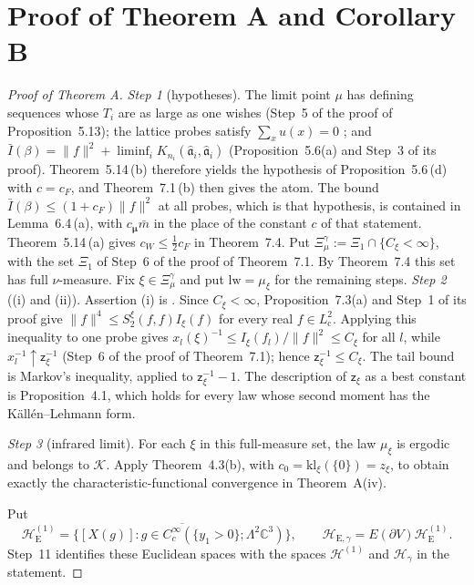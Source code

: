 \documentclass[11pt]{amsart}
\theoremstyle{definition}
\begin{document}
\section{Proof of Theorem A and Corollary B}
\begin{proof}[Proof of Theorem A]
\emph{Step 1} (hypotheses).
The limit point $\mu$ has defining sequences whose $T_i$ are as large as one wishes (Step~5 of the proof of Proposition~5.13);
the lattice probes satisfy $\sum_xu(x)=0$ \cite[Proposition~47.1\,(b1)]{QEDIII};
and $\bar I(\beta)=\allowbreak \|f\|^2+\liminf_iK_{n_i}(\hat{\mathfrak a}_i,\allowbreak \hat{\mathfrak a}_i)$ (Proposition~5.6(a) and Step~3 of its proof).
Theorem~5.14\,(b) therefore yields the hypothesis of Proposition~5.6\,(d) with $c=c_F$, and Theorem~7.1\,(b) then gives the atom.
The bound $\bar I(\beta)\le(1+c_F)\|f\|^2$ at all probes, which is that hypothesis, is contained in Lemma~6.4\,(a), with $c_{\boldsymbol\mu}\bar m$ in the place of the constant $c$ of that statement.
Theorem~5.14\,(a) gives $c_W\le\frac12c_F$ in Theorem~7.4.
Put $\Xi^\gamma_\mu:=\Xi_1\cap\{C_\xi<\infty\}$, with the set $\Xi_1$ of Step~6 of the proof of Theorem~7.1. By Theorem~7.4 this set has full $\nu$-measure.
Fix $\xi\in\Xi^\gamma_\mu$ and put $\mathrm{lw}=\mu_\xi$ for the remaining steps.
\emph{Step 2} ((i) and (ii)).
Assertion (i) is \cite[Theorem~1.4, Part~I\,(e), (f), Part~II]{QEDII}.
Since $C_\xi<\infty$, Proposition~7.3(a) and Step~1 of its proof give
$\|f\|^4\le S_2^\xi(f,f)I_\xi(f)$ for every real $f\in L^2_{\mathrm c}$.
Applying this inequality to one probe gives $x_l(\xi)^{-1}\le I_\xi(f_l)/\|f\|^2\le C_\xi$ for all $l$, while $x_l^{-1}\uparrow\mathsf z_\xi^{-1}$ (Step~6 of the proof of Theorem~7.1);
hence $\mathsf z_\xi^{-1}\le C_\xi$.
The tail bound is Markov's inequality, applied to $\mathsf z_\xi^{-1}-1$.
The description of $\mathsf z_\xi$ as a best constant is Proposition~4.1, which holds for every law whose second moment has the K\"all\'en--Lehmann form.

\emph{Step 3} (infrared limit).
For each $\xi$ in this full-measure set, the law $\mu_\xi$ is ergodic
and belongs to $\mathcal K$. Apply Theorem~4.3(b), with
$c_0=\mathrm{kl}_\xi(\{0\})=z_\xi$, to obtain exactly the
characteristic-functional convergence in Theorem~A(iv).

Put
\[
\mathcal H_{\mathrm E}^{(1)}=
\overline{\{[X(g)]:g\in C_c^\infty(\{y_1>0\};\Lambda^2\mathbb C^3)\}},
\qquad
\mathcal H_{\mathrm E,\gamma}=E(\partial V)\mathcal H_{\mathrm E}^{(1)}.
\]
Step~11 identifies these Euclidean spaces with the spaces
$\mathcal H^{(1)}$ and $\mathcal H_\gamma$ in the statement.


\end{proof}
\end{document}
